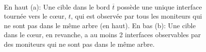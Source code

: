 \begin{figure}[!ht]\centering
{}
\\
\caption[Filtrage des adresses de routeurs du c\oe{}ur]{En haut (a): Une cible dans
le bord $\overline{t}$ possède une unique interface tournée vers le c\oe{}ur, $t$, qui est observée par tous les moniteurs
qui ne sont pas dans le même arbre (en haut). En bas (b): Une cible dans le
c\oe{}ur, en revanche, a au moins 2 interfaces observables par des moniteurs qui ne
sont pas dans le même arbre.}
\label{fig:udpping-filter-core}
\end{figure}


